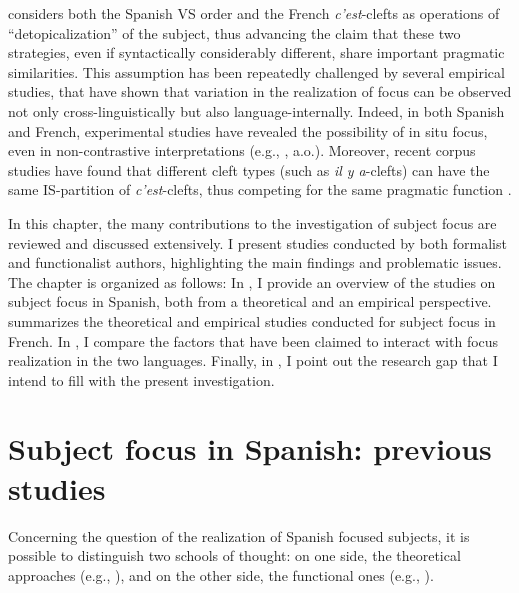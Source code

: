 \textcite{lambrecht2001framework} considers both the Spanish VS order and the French \textit{c'est}-clefts as operations of ``detopicalization” of the subject, thus advancing the claim that these two strategies, even if syntactically considerably different, share important pragmatic similarities. This assumption has been repeatedly challenged by several empirical studies, that have shown that variation in the realization of focus can be observed not only cross-linguistically but also language-internally. Indeed, in both Spanish and French, experimental studies have revealed the possibility of in situ focus, even in non-contrastive interpretations (e.g., \cite{gabriel2007fokus, gabriel2010focus, heidinger2013information, bosch2013variation}, a.o.). Moreover, recent corpus studies have found that different cleft types (such as \textit{il y a}-clefts) can have the same IS-partition of \textit{c'est}-clefts, thus competing for the same pragmatic function \parencite{karssenberg2017oiseaux, Karssenberg+2018}.

In this chapter, the many contributions to the investigation of subject focus are reviewed and discussed extensively. I present studies conducted by both formalist and functionalist authors, highlighting the main findings and problematic issues. The chapter is organized as follows: In , I provide an overview of the studies on subject focus in Spanish, both from a theoretical and an empirical perspective.  summarizes the theoretical and empirical studies conducted for subject focus in French. In , I compare the factors that have been claimed to interact with focus realization in the two languages. Finally, in , I point out the research gap that I intend to fill with the present investigation.


\section{Subject focus in Spanish: previous studies} \label{sub:3.2}


Concerning the question of the realization of Spanish focused subjects, it is possible to distinguish two schools of thought:  on one side, the theoretical approaches (e.g., \cite{zubizarreta1998prosody, ramalle2005manual, costa2001postverbal, gutierrez2013structural, samek2001crosslinguistic}), and on the other side, the functional ones (e.g., \cite{gabriel2007fokus, gabriel2010focus, heidinger2013information, uth2014spanish, hualde2002intonation}).

